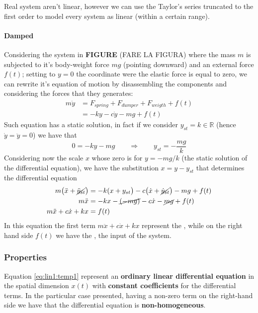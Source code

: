 	Real system aren't linear, however we can use the Taylor's series truncated to the first order to model every system as linear (within a certain range).
	
	\paragraph{Damped } Considering the system in \textbf{FIGURE} (FARE LA FIGURA) where the mass $m$ is subjected to it's body-weight force $mg$ (pointing downward) and an external force $f(t)$; setting to $y=0$ the coordinate were the elastic force is equal to zero, we can rewrite it's equation of motion by disassembling the components and considering the forces that they generates:
	\begin{align*}
		m \ddot y & = F_{spring} + F_{dumper} + F_{weigth} + f(t) \\
		& = - k y - c \dot y - mg + f(t)
	\end{align*}
	Such equation has a static solution, in fact if we consider $y_{st} = k\in \mathds R$ (hence $\dot y = \ddot y = 0$) we have that
	\[ 0 = -ky - mg \qquad \Rightarrow \qquad y_{st} = - \frac{mg}{k} \]
	Considering now the scale $x$ whose zero is for $y = - mg/k$ (the static solution of the differential equation), we have the substitution $x = y - y_{st}$ that determines the differential equation
	\begin{equation} \label{eq:lin1:temp1}
	\begin{aligned}
		m\big(\ddot x + \cancel{\ddot y_{st}}\big) & = - k (x+ y_{st}\big) - c \big(\dot x + \cancel{\dot y_{st}}\big) - mg + f(t) \\
		m\ddot x & = - k x - \cancel{(-mg)} - c\dot x -\cancel{ mg }+ f(t) \\
		m\ddot x + c\dot x + k x& = f(t)
	\end{aligned} 
	\end{equation}
	In this equation the first term $m\ddot x + c\dot x + kx$ represent the , while on the right hand side $f(t)$ we have the , the input of the system.
	
	\subsubsection{Properties}
		Equation \ref{eq:lin1:temp1} represent an \textbf{ordinary linear differential equation} in the spatial dimension $x(t)$ with \textbf{constant coefficients} for the differential terms. In the particular case presented, having a non-zero term on the right-hand side we have that the differential equation is \textbf{non-homogeneous}.
		
